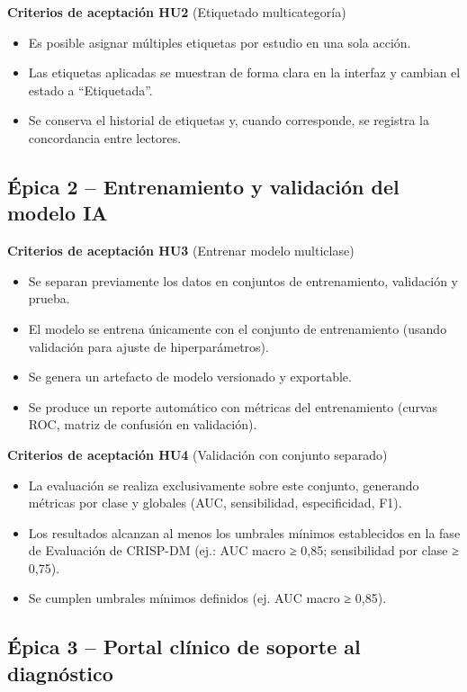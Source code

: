 \documentclass[
11pt, %
]{charter}
\begin{document}
\textbf{Criterios de aceptación HU2} (Etiquetado multicategoría)
\begin{itemize}
  \item Es posible asignar múltiples etiquetas por estudio en una sola acción.
  \item Las etiquetas aplicadas se muestran de forma clara en la interfaz y cambian el estado a “Etiquetada”.
  \item Se conserva el historial de etiquetas y, cuando corresponde, se registra la concordancia entre lectores.
\end{itemize}

\subsection*{Épica 2 – Entrenamiento y validación del modelo IA}

\textbf{Criterios de aceptación HU3} (Entrenar modelo multiclase)
\begin{itemize}
  \item Se separan previamente los datos en conjuntos de entrenamiento, validación y prueba.
  \item El modelo se entrena únicamente con el conjunto de entrenamiento (usando validación para ajuste de hiperparámetros).
  \item Se genera un artefacto de modelo versionado y exportable.
  \item Se produce un reporte automático con métricas del entrenamiento (curvas ROC, matriz de confusión en validación).
\end{itemize}

\textbf{Criterios de aceptación HU4} (Validación con conjunto separado)
\begin{itemize}
  \item La evaluación se realiza exclusivamente sobre este conjunto, generando métricas por clase y globales (AUC, sensibilidad, especificidad, F1).
  \item Los resultados alcanzan al menos los umbrales mínimos establecidos en la fase de Evaluación de CRISP-DM (ej.: AUC macro ≥ 0,85; sensibilidad por clase ≥ 0,75).
  \item Se cumplen umbrales mínimos definidos (ej. AUC macro ≥ 0,85).
\end{itemize}



\subsection*{Épica 3 – Portal clínico de soporte al diagnóstico}
\end{document}

